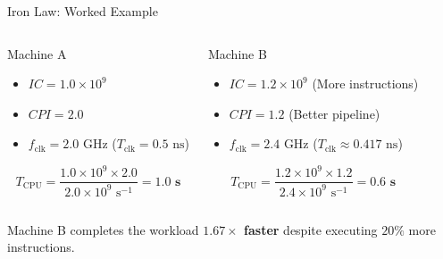 \documentclass[aspectratio=169,11pt]{beamer}
\newcommand{\key}[1]{\textbf{#1}}
\begin{document}

\begin{frame}{Iron Law: Worked Example}

\begin{columns}[T,onlytextwidth]

\begin{block}{Machine A}
\begin{itemize}
  \item $\mathit{IC} = 1.0 \times 10^9$
  \item $\mathit{CPI} = 2.0$
  \item $f_{\text{clk}} = 2.0\text{ GHz}$ ($T_{\text{clk}} = 0.5\text{ ns}$)
\end{itemize}
$$T_{\text{CPU}} = \frac{1.0 \times 10^9 \times 2.0}{2.0 \times 10^9\text{ s}^{-1}} = \mathbf{1.0\text{ s}}$$
\end{block}

\begin{block}{Machine B}
\begin{itemize}
  \item $\mathit{IC} = 1.2 \times 10^9$ (More instructions)
  \item $\mathit{CPI} = 1.2$ (Better pipeline)
  \item $f_{\text{clk}} = 2.4\text{ GHz}$ ($T_{\text{clk}} \approx 0.417\text{ ns}$)
\end{itemize}
$$T_{\text{CPU}} = \frac{1.2 \times 10^9 \times 1.2}{2.4 \times 10^9\text{ s}^{-1}} = \mathbf{0.6\text{ s}}$$
\end{block}

\end{columns}

\vspace{0.4em}
Machine B completes the workload \key{$1.67\times$ faster} despite executing $20\%$ more instructions.

\end{frame}

\end{document}
